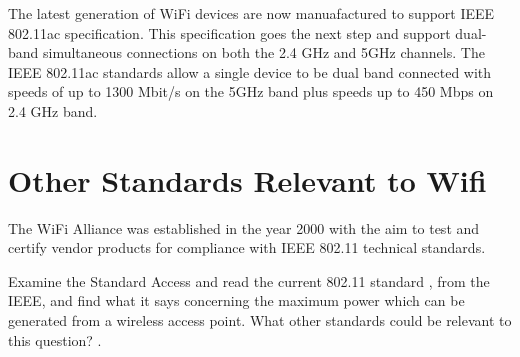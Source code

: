 The latest generation of WiFi devices are now manuafactured to support
IEEE 802.11ac specification.  This specification goes the next step and
support dual-band simultaneous connections on both the 2.4 GHz and 5GHz
channels. The IEEE 802.11ac standards allow a single device to be dual
band connected with speeds of up to 1300 Mbit/s on the 5GHz band plus
speeds up to 450 Mbps on 2.4 GHz band.



\section{Other Standards Relevant to Wifi}

The WiFi Alliance was established in the year 2000 with the aim to test
and certify vendor products for compliance with IEEE 802.11 technical
standards.

\begin{exercise}{Examine the Standard}
Access and read the current 802.11 standard \cite{ieee802_11standard}, from the IEEE, and find what it says
concerning the maximum power which can be generated from a wireless access point.
What other standards could be relevant to this question? \cite{alhasmawi2020}.
\end{exercise}
